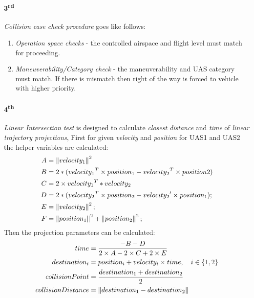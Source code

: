 \paragraph{3\textsuperscript{rd}} \emph{Collision case check procedure} goes like follows:
\begin{enumerate}
    \item \emph{Operation space checks} - the controlled airspace and flight level must match for proceeding.
    
    \item \emph{Maneuverability/Category check} - the maneuverability and UAS category must match. If there is mismatch then right of the way is forced to vehicle with higher priority.
\end{enumerate}

\paragraph{4\textsuperscript{th}} \emph{Linear Intersection test} is designed to calculate \emph{closest distance} and \emph{time} of \emph{linear trajectory projections},  First for given \emph{velocity} and \emph{position} for UAS1 and UAS2 the helper variables are calculated:
\begin{equation}
    \begin{aligned}
        A&=\left\lVert velocity_1\right\rVert^2\\
        B&=2*({velocity_1}^T\times position_1-{velocity_2}^T\times position2)\\
        C&=2\times {velocity_1}^T *velocity_2\\
        D&=2*({velocity_2}^T \times position_2 - {velocity_2}' \times {position_1});\\
        E&=\left\lVert velocity_2\right\rVert^2;\\
        F&=\left\lVert position_1\right\rVert^2 + \left\lVert position_2\right\rVert^2;\\
    \end{aligned}\\
\end{equation}
\noindent Then the projection parameters can be calculated:
\begin{equation}
    \begin{aligned}
    time& = \frac{-B-D}{2 \times A- 2 \times C+ 2 \times E}\\
    destination_i &= position_i + velocity_i \times time, \quad i \in \{1,2\}\\
    collisionPoint &= \frac{destination_1 + destination_2}{2}\\
    collisionDistance &= \left\lVert destination_1 - destination_2\right\rVert\\
    \end{aligned}
\end{equation}

